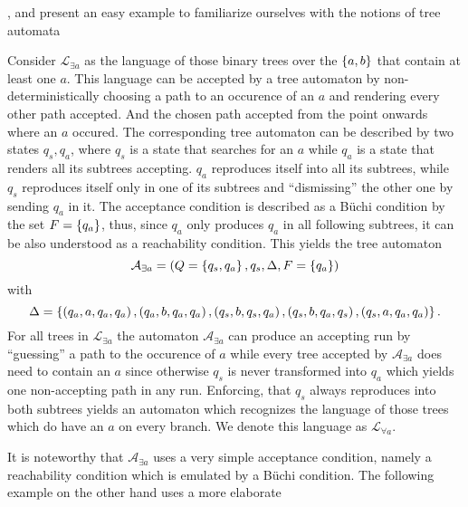      , and present an easy example 
to familiarize ourselves with the notions of tree automata
\begin{example}
  Consider $\mathcal{L}_{\exists a}$ as the language of those binary trees over 
  the $\left\{a,b\right\}$ that contain at least one $a$. This language can be accepted 
  by a tree automaton by non-deterministically choosing a path to an occurence 
  of an $a$ and rendering every other path accepted. And the chosen path 
  accepted from the point onwards where an $a$ occured. The corresponding tree 
  automaton can be described by two states $q_{s}, q_{a}$, where $q_{s}$ is a 
  state that searches for an $a$ while $q_{a}$ is a state that renders all its 
  subtrees accepting. $q_{a}$ reproduces itself into all its subtrees, while 
  $q_{s}$ reproduces itself only in one of its subtrees and 
  \enquote{dismissing} the other one by sending $q_{a}$ in it. The acceptance 
  condition is described as a Büchi condition by the set $F = \left\{q_{a}\right\}$, 
  thus, since $q_{a}$ only produces $q_{a}$ in all following subtrees, it can 
  be also understood as a reachability condition. This yields the tree 
  automaton
  \begin{equation*}
    \mathcal{A}_{\exists a} = \left(Q = \left\{q_{s}, q_{a}\right\}, q_{s},
    \Delta ,F = \left\{q_{a}\right\}\right)
  \end{equation*}
  with
  \begin{equation*}
    \Delta = \left\{\left(q_{a}, a, q_{a}, q_{a}\right),\left(q_{a}, b, q_{a}, q_{a}\right),
      \left(q_{s}, b, q_{s}, q_{a}\right), \left(q_{s}, b, q_{a}, q_{s}\right),
      \left(q_{s}, a, q_{a}, q_{a}\right)\right\}.
  \end{equation*}
  For all trees in $\mathcal{L}_{\exists a}$ the automaton
  $\mathcal{A}_{\exists a}$ can produce an accepting run by \enquote{guessing}
  a path to the occurence of $a$ while every tree accepted by
  $\mathcal{A}_{\exists a}$ does need to contain an $a$ since otherwise $q_{s}$
  is never transformed into $q_{a}$ which yields one non-accepting path in any
  run. Enforcing, that $q_{s}$ always reproduces into both subtrees yields an
  automaton which recognizes the language of those trees which do have an $a$
  on every branch. We denote this language as $\mathcal{L}_{\forall a}$.
  \label{ex:treeexa}
\end{example}
It is noteworthy that $\mathcal{A}_{\exists a}$ uses a very simple acceptance
condition, namely a reachability condition which is emulated by a Büchi
condition. The following example on the other hand uses a more elaborate
